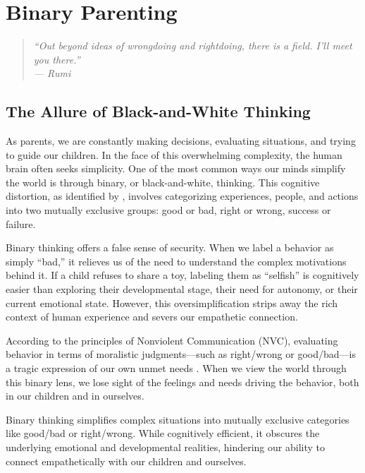 \chapter{Binary Parenting}

\begin{quote}
\itshape ``Out beyond ideas of wrongdoing and rightdoing, there is a field. I'll meet you there.''\\
\upshape --- Rumi
\end{quote}

\newpage
\section{The Allure of Black-and-White Thinking}

As parents, we are constantly making decisions, evaluating situations, and trying to guide our children.
In the face of this overwhelming complexity, the human brain often seeks simplicity.
One of the most common ways our minds simplify the world is through binary, or black-and-white, thinking.
This cognitive distortion, as identified by \citet{beck1979}, involves categorizing experiences, people, and actions into two mutually exclusive groups: good or bad, right or wrong, success or failure.

Binary thinking offers a false sense of security.
When we label a behavior as simply ``bad,'' it relieves us of the need to understand the complex motivations behind it.
If a child refuses to share a toy, labeling them as ``selfish'' is cognitively easier than exploring their developmental stage, their need for autonomy, or their current emotional state.
However, this oversimplification strips away the rich context of human experience and severs our empathetic connection.

According to the principles of Nonviolent Communication (NVC), evaluating behavior in terms of moralistic judgments---such as right/wrong or good/bad---is a tragic expression of our own unmet needs \citep{rosenberg2003}.
When we view the world through this binary lens, we lose sight of the feelings and needs driving the behavior, both in our children and in ourselves.

\begin{keyinsight}
Binary thinking simplifies complex situations into mutually exclusive categories like good/bad or right/wrong.
While cognitively efficient, it obscures the underlying emotional and developmental realities, hindering our ability to connect empathetically with our children and ourselves.
\end{keyinsight}


